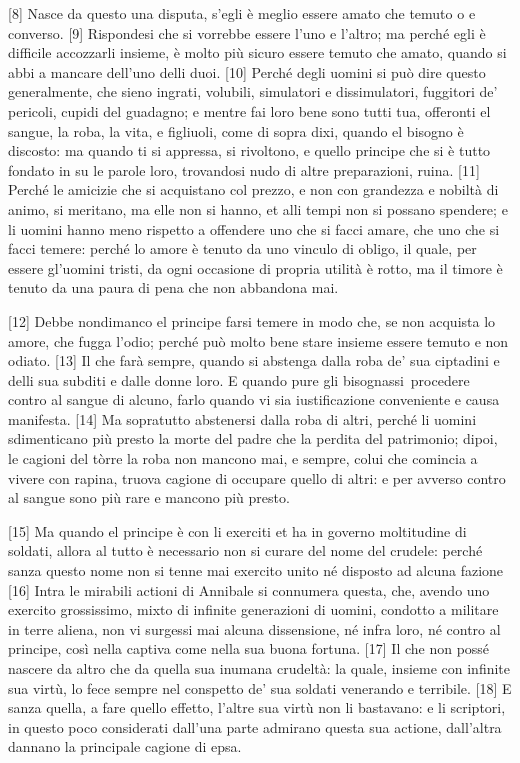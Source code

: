 \pagebreak

{[}8{]} Nasce da questo una disputa, s'egli è meglio essere amato che
temuto o e converso. {[}9{]} Rispondesi che si vorrebbe essere l'uno e
l'altro; ma perché egli è difficile accozzarli insieme, è molto più
sicuro essere temuto che amato, quando si abbi a mancare dell'uno delli
duoi. {[}10{]} Perché degli uomini si può dire questo generalmente, che
sieno ingrati, volubili, simulatori e dissimulatori, fuggitori de'
pericoli, cupidi del guadagno; e mentre fai loro bene sono tutti tua,
offeronti el sangue, la roba, la vita, e figliuoli, come di sopra dixi,
quando el bisogno è discosto: ma quando ti si appressa, si rivoltono, e
quello principe che si è tutto fondato in su le parole loro, trovandosi
nudo di altre preparazioni, ruina. {[}11{]} Perché le amicizie che si
acquistano col prezzo, e non con grandezza e nobiltà di animo, si
meritano, ma elle non si hanno, et alli tempi non si possano spendere; e
li uomini hanno meno rispetto a offendere uno che si facci amare, che
uno che si facci temere: perché lo amore è tenuto da uno vinculo di
obligo, il quale, per essere gl'uomini tristi, da ogni occasione di
propria utilità è rotto, ma il timore è tenuto da una paura di pena che
non abbandona mai.

{[}12{]} Debbe nondimanco el principe farsi temere in modo che, se non
acquista lo amore, che fugga l'odio; perché può molto bene stare insieme
essere temuto e non odiato. {[}13{]} Il che farà sempre, quando si
abstenga dalla roba de' sua ciptadini e delli sua subditi e dalle donne
loro. E quando pure gli bisognassi\est\ procedere contro al sangue di alcuno,
farlo quando vi sia iustificazione conveniente e causa manifesta.
{[}14{]} Ma sopratutto abstenersi dalla roba di altri, perché li uomini
sdimenticano più presto la morte del padre che la perdita del
patrimonio; dipoi, le cagioni del tòrre la roba non mancono mai, e
sempre, colui che comincia a vivere con rapina, truova cagione di
occupare quello di altri: e per avverso contro al sangue sono più rare e
mancono più presto.

{[}15{]} Ma quando el principe è con li exerciti et ha in governo
moltitudine di soldati, allora al tutto è necessario non si curare del
nome del crudele: perché sanza questo nome non si tenne mai exercito
unito né disposto ad alcuna fazione {[}16{]} Intra le mirabili actioni
di Annibale si connumera questa, che, avendo uno exercito grossissimo,
mixto di infinite generazioni di uomini, condotto a militare in terre
aliena, non vi surgessi mai alcuna dissensione, né infra loro, né contro
al principe, così nella captiva come nella sua buona fortuna. {[}17{]}
Il che non possé nascere da altro che da quella sua inumana crudeltà: la
quale, insieme con infinite sua virtù, lo fece sempre nel conspetto de'
sua soldati venerando e terribile. {[}18{]} E sanza quella, a fare
quello effetto, l'altre sua virtù non li bastavano: e li scriptori, in
questo poco considerati dall'una parte admirano questa sua actione,
dall'altra dannano la principale cagione di epsa.

